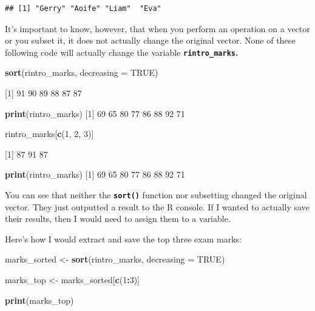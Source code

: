 \documentclass[
]{book}
\newenvironment{Shaded}{\begin{snugshade}}{\end{snugshade}}
\newcommand{\AttributeTok}[1]{\textcolor[rgb]{0.13,0.29,0.53}{#1}}
\newcommand{\ConstantTok}[1]{\textcolor[rgb]{0.56,0.35,0.01}{#1}}
\newcommand{\DecValTok}[1]{\textcolor[rgb]{0.00,0.00,0.81}{#1}}
\newcommand{\FunctionTok}[1]{\textcolor[rgb]{0.13,0.29,0.53}{\textbf{#1}}}
\newcommand{\NormalTok}[1]{#1}
\newcommand{\OtherTok}[1]{\textcolor[rgb]{0.56,0.35,0.01}{#1}}
\newcommand{\SpecialCharTok}[1]{\textcolor[rgb]{0.81,0.36,0.00}{\textbf{#1}}}
\begin{document}
\begin{verbatim}
## [1] "Gerry" "Aoife" "Liam"  "Eva"
\end{verbatim}

It's important to know, however, that when you perform an operation on a vector or you subset it, it does not actually change the original vector. None of these following code will actually change the variable \textbf{\texttt{rintro\_marks}.}

\begin{Shaded}
\begin{Highlighting}[]
\FunctionTok{sort}\NormalTok{(rintro\_marks, }\AttributeTok{decreasing =} \ConstantTok{TRUE}\NormalTok{)}

\NormalTok{[}\DecValTok{1}\NormalTok{] }\DecValTok{91} \DecValTok{90} \DecValTok{89} \DecValTok{88} \DecValTok{87} \DecValTok{87}

\FunctionTok{print}\NormalTok{(rintro\_marks)}
\NormalTok{[}\DecValTok{1}\NormalTok{] }\DecValTok{69} \DecValTok{65} \DecValTok{80} \DecValTok{77} \DecValTok{86} \DecValTok{88} \DecValTok{92} \DecValTok{71}

\NormalTok{rintro\_marks[}\FunctionTok{c}\NormalTok{(}\DecValTok{1}\NormalTok{, }\DecValTok{2}\NormalTok{, }\DecValTok{3}\NormalTok{)]}

\NormalTok{[}\DecValTok{1}\NormalTok{] }\DecValTok{87} \DecValTok{91} \DecValTok{87}

\FunctionTok{print}\NormalTok{(rintro\_marks)}
\NormalTok{[}\DecValTok{1}\NormalTok{] }\DecValTok{69} \DecValTok{65} \DecValTok{80} \DecValTok{77} \DecValTok{86} \DecValTok{88} \DecValTok{92} \DecValTok{71}
\end{Highlighting}
\end{Shaded}

You can see that neither the \textbf{\texttt{sort()}} function nor subsetting changed the original vector. They just outputted a result to the R console. If I wanted to actually save their results, then I would need to assign them to a variable.

Here's how I would extract and save the top three exam marks:

\begin{Shaded}
\begin{Highlighting}[]
\NormalTok{marks\_sorted }\OtherTok{\textless{}{-}} \FunctionTok{sort}\NormalTok{(rintro\_marks, }\AttributeTok{decreasing =} \ConstantTok{TRUE}\NormalTok{)}

\NormalTok{marks\_top }\OtherTok{\textless{}{-}}\NormalTok{ marks\_sorted[}\FunctionTok{c}\NormalTok{(}\DecValTok{1}\SpecialCharTok{:}\DecValTok{3}\NormalTok{)]}

\FunctionTok{print}\NormalTok{(marks\_top)}
\end{Highlighting}
\end{Shaded}
\end{document}
